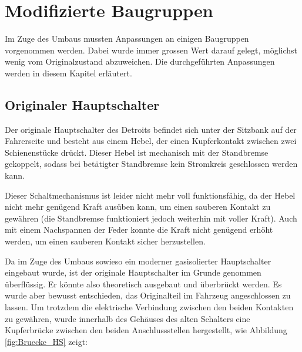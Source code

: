 \section{Modifizierte Baugruppen}

\color{blue}
Im Zuge des Umbaus mussten Anpassungen an einigen Baugruppen vorgenommen werden. Dabei wurde immer grossen Wert darauf gelegt, möglichst wenig vom Originalzustand abzuweichen. Die durchgeführten Anpassungen werden in diesem Kapitel erläutert.

\subsection{Originaler Hauptschalter}
Der originale Hauptschalter des Detroits befindet sich unter der Sitzbank auf der Fahrerseite und besteht aus einem Hebel, der einen Kupferkontakt zwischen zwei Schienenstücke drückt. Dieser Hebel ist mechanisch mit der Standbremse gekoppelt, sodass bei betätigter Standbremse kein Stromkreis geschlossen werden kann.

Dieser Schaltmechanismus ist leider nicht mehr voll funktionsfähig, da der Hebel nicht mehr genügend Kraft ausüben kann, um einen sauberen Kontakt zu gewähren (die Standbremse funktioniert jedoch weiterhin mit voller Kraft). Auch mit einem Nachspannen der Feder konnte die Kraft nicht genügend erhöht werden, um einen sauberen Kontakt sicher herzustellen.

Da im Zuge des Umbaus sowieso ein moderner gasisolierter Hauptschalter eingebaut wurde, ist der originale Hauptschalter im Grunde genommen überflüssig. Er könnte also theoretisch ausgebaut und überbrückt werden. Es wurde aber bewusst entschieden, das Originalteil im Fahrzeug angeschlossen zu lassen. Um trotzdem die elektrische Verbindung zwischen den beiden Kontakten zu gewähren, wurde innerhalb des Gehäuses des alten Schalters eine Kupferbrücke zwischen den beiden Anschlussstellen hergestellt, wie Abbildung \ref{fig:Bruecke_HS} zeigt:


